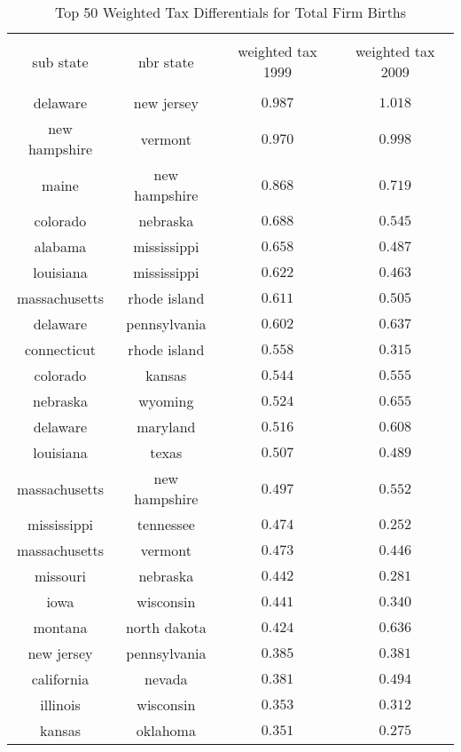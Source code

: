 
\begin{table}[!htbp] \centering 
  \caption{Top 50 Weighted Tax Differentials for Total Firm Births} 
  \label{} 
\tiny 
\begin{tabular}{@{\extracolsep{5pt}} cccc} 
\\[-1.8ex]\hline 
\hline \\[-1.8ex] 
sub state & nbr state & weighted tax 1999 & weighted tax 2009 \\ 
\hline \\[-1.8ex] 
delaware & new jersey & $0.987$ & $1.018$ \\ 
new hampshire & vermont & $0.970$ & $0.998$ \\ 
maine & new hampshire & $0.868$ & $0.719$ \\ 
colorado & nebraska & $0.688$ & $0.545$ \\ 
alabama & mississippi & $0.658$ & $0.487$ \\ 
louisiana & mississippi & $0.622$ & $0.463$ \\ 
massachusetts & rhode island & $0.611$ & $0.505$ \\ 
delaware & pennsylvania & $0.602$ & $0.637$ \\ 
connecticut & rhode island & $0.558$ & $0.315$ \\ 
colorado & kansas & $0.544$ & $0.555$ \\ 
nebraska & wyoming & $0.524$ & $0.655$ \\ 
delaware & maryland & $0.516$ & $0.608$ \\ 
louisiana & texas & $0.507$ & $0.489$ \\ 
massachusetts & new hampshire & $0.497$ & $0.552$ \\ 
mississippi & tennessee & $0.474$ & $0.252$ \\ 
massachusetts & vermont & $0.473$ & $0.446$ \\ 
missouri & nebraska & $0.442$ & $0.281$ \\ 
iowa & wisconsin & $0.441$ & $0.340$ \\ 
montana & north dakota & $0.424$ & $0.636$ \\ 
new jersey & pennsylvania & $0.385$ & $0.381$ \\ 
california & nevada & $0.381$ & $0.494$ \\ 
illinois & wisconsin & $0.353$ & $0.312$ \\ 
kansas & oklahoma & $0.351$ & $0.275$ \\ 

\end{tabular}
\end{table}
